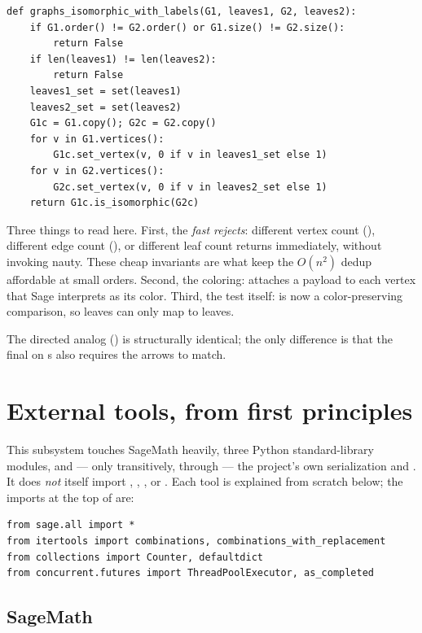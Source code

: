 \begin{lstlisting}
def graphs_isomorphic_with_labels(G1, leaves1, G2, leaves2):
    if G1.order() != G2.order() or G1.size() != G2.size():
        return False
    if len(leaves1) != len(leaves2):
        return False
    leaves1_set = set(leaves1)
    leaves2_set = set(leaves2)
    G1c = G1.copy(); G2c = G2.copy()
    for v in G1.vertices():
        G1c.set_vertex(v, 0 if v in leaves1_set else 1)
    for v in G2.vertices():
        G2c.set_vertex(v, 0 if v in leaves2_set else 1)
    return G1c.is_isomorphic(G2c)
\end{lstlisting}

Three things to read here. First, the \emph{fast rejects}: different vertex count
(), different edge count (), or different leaf count
returns  immediately, without invoking nauty. These cheap invariants
are what keep the $O(n^2)$ dedup affordable at small orders. Second, the coloring:
 attaches a payload to each vertex that Sage
interprets as its color. Third, the test itself:  is
now a color-preserving comparison, so leaves can only map to leaves.

The directed analog 
() is structurally identical; the only
difference is that the final  on s also
requires the arrows to match.

\section{External tools, from first principles}

This subsystem touches SageMath heavily, three Python standard-library modules,
and --- only transitively, through  --- the project's own
serialization and . It does \emph{not} itself import
, , , or . Each tool is
explained from scratch below; the imports at the top of
 are:

\begin{lstlisting}
from sage.all import *
from itertools import combinations, combinations_with_replacement
from collections import Counter, defaultdict
from concurrent.futures import ThreadPoolExecutor, as_completed
\end{lstlisting}

\subsection{SageMath}
\label{sec:sage}

